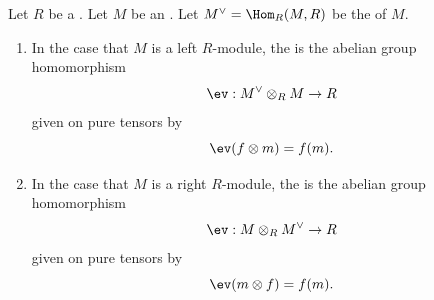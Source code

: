 \begin{definition} \label{definition:evaluation_map_for_a_module_over_a_ring}
    Let $R$ be a . Let $M$ be an . Let $M^\vee = \Hom_R(M,R)$ be the  of $M$. 
    \begin{enumerate}
        \item In the case that $M$ is a left $R$-module, the  is the abelian group homomorphism
        $$\ev: M^\vee \otimes_R M \to R$$
        given on pure tensors by 
        $$\ev(f \otimes m) = f(m).$$

        \item In the case that $M$ is a right $R$-module, the  is the abelian group homomorphism
        $$\ev: M \otimes_R M^\vee \to R$$
        given on pure tensors by 
        $$\ev(m \otimes f) = f(m).$$
    \end{enumerate}
\end{definition}